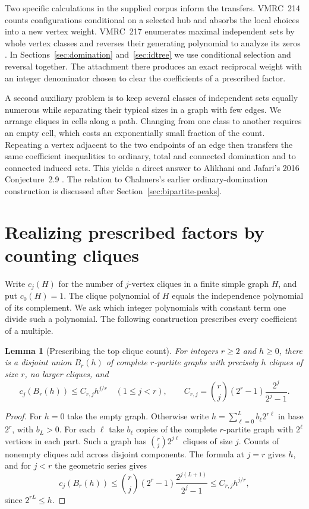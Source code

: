 \documentclass[11pt,a4paper]{article}
\newtheorem{lemma}[theorem]{Lemma}
\begin{document}
Two specific calculations in the supplied corpus inform the transfers. VMRC~214 counts configurations conditional on a selected hub and absorbs the local choices into a new vertex weight. VMRC~217 enumerates maximal independent sets by whole vertex classes and reverses their generating polynomial to analyze its zeros \cite{vmrc}. In Sections~\ref{sec:domination} and~\ref{sec:idtree} we use conditional selection and reversal together. The attachment there produces an exact reciprocal weight with an integer denominator chosen to clear the coefficients of a prescribed factor.

A second auxiliary problem is to keep several classes of independent sets equally numerous while separating their typical sizes in a graph with few edges. We arrange cliques in cells along a path. Changing from one class to another requires an empty cell, which costs an exponentially small fraction of the count. Repeating a vertex adjacent to the two endpoints of an edge then transfers the same coefficient inequalities to ordinary, total and connected domination and to connected induced sets. This yields a direct answer to Alikhani and Jafari's 2016 Conjecture~2.9 \cite{alijafari}. The relation to Chalmers's earlier ordinary-domination construction is discussed after Section~\ref{sec:bipartite-peaks}.

\section{Realizing prescribed factors by counting cliques}
\label{sec:arithmetic-realization}

Write $c_j(H)$ for the number of $j$-vertex cliques in a finite simple graph
$H$, and put $c_0(H)=1$. The clique polynomial of $H$ equals the independence
polynomial of its complement. We ask which integer polynomials with constant
term one divide such a polynomial. The following construction prescribes every
coefficient of a multiple.

\begin{lemma}[Prescribing the top clique count]\label{lem:digit-cliques}
For integers $r\ge2$ and $h\ge0$, there is a disjoint union $B_r(h)$ of
complete $r$-partite graphs with precisely $h$ cliques of size $r$, no larger
cliques, and
\[
 c_j(B_r(h))\le C_{r,j}h^{j/r}\quad(1\le j<r),\qquad
 C_{r,j}=\binom rj(2^r-1)\frac{2^j}{2^j-1}.
\]
\end{lemma}
\begin{proof}
For $h=0$ take the empty graph. Otherwise write
$h=\sum_{\ell=0}^{L}b_\ell 2^{r\ell}$ in base $2^r$, with $b_L>0$.
For each $\ell$ take $b_\ell$ copies of the complete $r$-partite graph
with $2^\ell$ vertices in each part. Such a graph has
$\binom{r}{j}2^{j\ell}$ cliques of size $j$. Counts of nonempty cliques
add across disjoint components. The formula at $j=r$ gives $h$, and for
$j<r$ the geometric series gives
\[
 c_j(B_r(h))
 \le \binom rj(2^r-1)\frac{2^{j(L+1)}}{2^j-1}
 \le C_{r,j}h^{j/r},
\]
since $2^{rL}\le h$.
\end{proof}
\end{document}
